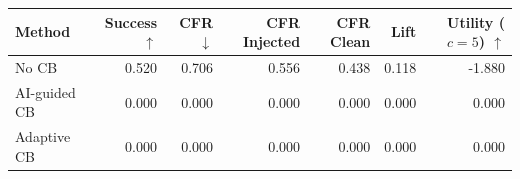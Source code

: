 \begin{tabular}{lrrrrrr}
\toprule
Method & Success $\uparrow$ & CFR $\downarrow$ & CFR Injected & CFR Clean & Lift & Utility ($c=5$) $\uparrow$ \\
\midrule
No CB & 0.520 & 0.706 & 0.556 & 0.438 & 0.118 & -1.880 \\
AI-guided CB & 0.000 & 0.000 & 0.000 & 0.000 & 0.000 & 0.000 \\
Adaptive CB & 0.000 & 0.000 & 0.000 & 0.000 & 0.000 & 0.000 \\
\bottomrule
\end{tabular}
